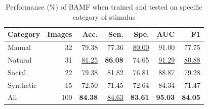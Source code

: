 \documentclass[conference,a4paper]{IEEEtran}
\begin{document}


\begin{table}[t]
\caption{Performance (\%) of BAMF when trained and tested on specific category of stimulus}
\label{tab:category_results}
\centering
\small
\setlength{\tabcolsep}{5.2pt}
\begin{tabular}{lrrrrrr}
\toprule
Category & Images & Acc. & Sen. & Spe. & AUC & F1 \\
\midrule

Manual & 32 & 79.38 & 77.36 & \underline{80.00} & 91.00 & 77.75 \\
Natural & 31 & \underline{81.25} & \textbf{86.08} & 74.65 & \underline{91.29} & \underline{80.88} \\
Social & 22 & 79.38 & 81.82 & 76.81 & 88.87 & 79.28 \\
Synthetic & 15 & 72.50 & 71.45 & 72.64 & 84.34 & 71.47 \\
All & 100 & \textbf{84.38} & \underline{84.63} & \textbf{83.61} & \textbf{95.03} & \textbf{84.05} \\
\bottomrule
\end{tabular}
\end{table}
\end{document}
